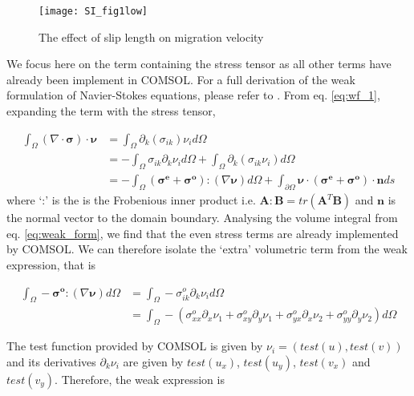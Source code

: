 \documentclass[%
 amsmath,amssymb,
 aps,
10.5pt]{revtex4-2}
\begin{document}
\begin{figure}[t] 
\vspace{-5pt}
\begin{center}
\texttt{[image: SI\_fig1low]}
\end{center}
\vspace{-15pt}
\caption{The effect of slip length on migration velocity
\label{SI_fig1} }
\vspace{-5pt}
\end{figure}




We focus here on the term containing the stress tensor as all other terms have already been implement in COMSOL. For a full derivation of the weak formulation of Navier-Stokes equations, please refer to \cite{ganesan2015,wind2014finite}. From eq. \ref{eq:wf_1}, expanding the term with the stress tensor,

\begin{align}
        \int_\Omega (\nabla \cdot \boldsymbol{\sigma})\cdot \boldsymbol{\nu} &= \int_\Omega \partial_k (\sigma_{ik})\nu_i d\Omega \nonumber\\
        &=  - \int_\Omega \sigma_{ik} \partial_k \nu_i d\Omega +\int_\Omega \partial_k (\sigma_{ik} \nu_i) d\Omega \nonumber\\
        &=  - \int_\Omega (\boldsymbol{\sigma^e}+\boldsymbol{\sigma^o}): (\nabla \boldsymbol{\nu}) d\Omega+ \int_{\partial \Omega}\boldsymbol{\nu} \cdot (\boldsymbol{\sigma^e}+\boldsymbol{\sigma^o} )\cdot \boldsymbol{n} ds \label{eq:weak_form}
\end{align}
where `:' is the is the Frobenious inner product i.e. $\boldsymbol{A}:\boldsymbol{B} = tr(\boldsymbol{A}^T\boldsymbol{B})$ and $\boldsymbol{n}$ is the normal vector to the domain boundary. Analysing the volume integral from eq. \ref{eq:weak_form}, we find that the even stress terms are already implemented by COMSOL. We can therefore isolate the `extra' volumetric term from the weak expression, that is

\begin{align}
    \int_{\Omega} -  \boldsymbol{\sigma^o}: (\nabla \boldsymbol{\nu}) d\Omega &= \int_{\Omega} -  \sigma^o_{ik} \partial_k \nu_i d\Omega\\
    &= \int_{\Omega} - \left(\sigma^o_{xx} \partial_x \nu_1 + \sigma^o_{xy} \partial_y \nu_1 + \sigma^o_{yx} \partial_x \nu_2 + \sigma^o_{yy} \partial_y \nu_2 \right) d\Omega
\end{align}

The test function provided by COMSOL is given by $\nu_i = ( test(u), test(v) )$ and its derivatives $\partial_k \nu_i$ are given by $test(u_x)$, $test(u_y)$, $test(v_x)$ and $test(v_y)$. Therefore, the weak expression is
\end{document}

